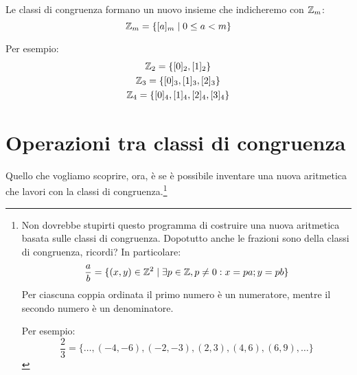 Le classi di congruenza formano un nuovo insieme che indicheremo con $ \mathbb{Z} _m$:
\begin{equation*}
     \mathbb{Z} _m = \{ [a]_m \mid 0 \le a < m \}
\end{equation*}

Per esempio:
\begin{gather*}
     \mathbb{Z} _2 = \{[0]_2, [1]_2\} \\
     \mathbb{Z} _3 = \{[0]_3, [1]_3, [2]_3\} \\
     \mathbb{Z} _4 = \{[0]_4, [1]_4, [2]_4, [3]_4\} \\
\end{gather*}

\section{Operazioni tra classi di congruenza}

Quello che vogliamo scoprire, ora, è se è possibile inventare una nuova aritmetica che lavori con la classi di congruenza.\footnote{Non dovrebbe stupirti questo programma di costruire una nuova aritmetica basata sulle classi di congruenza. Dopotutto anche le frazioni sono della classi di congruenza, ricordi? In particolare:
\begin{equation*}
    \dfrac{a}{b} = \{ (x, y) \in  \mathbb{Z} ^2 \mid \exists p \in  \mathbb{Z} , p \ne 0: x = pa; y = pb\}
\end{equation*}
Per ciascuna coppia ordinata il primo numero è un numeratore, mentre il secondo numero è un denominatore.

Per esempio:
\begin{equation*}
    \dfrac{2}{3} = \{ \dots, (-4, -6), (-2,-3), (2, 3), (4, 6), (6, 9), \dots \}
\end{equation*}
}

